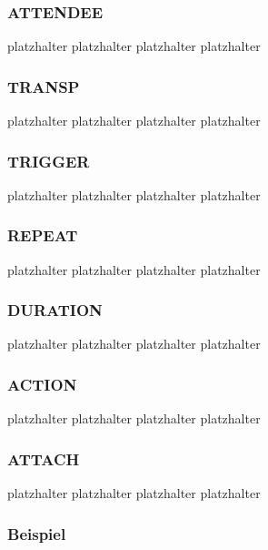 \subsubsection{ATTENDEE}
\label{sec:attendee}
platzhalter platzhalter platzhalter platzhalter 
\subsubsection{TRANSP}
\label{sec:transp}
platzhalter platzhalter platzhalter platzhalter 
\subsubsection{TRIGGER}
\label{sec:trigger}
platzhalter platzhalter platzhalter platzhalter 
\subsubsection{REPEAT}
\label{sec:repeat}
platzhalter platzhalter platzhalter platzhalter 
\subsubsection{DURATION}
\label{sec:duration}
platzhalter platzhalter platzhalter platzhalter 
\subsubsection{ACTION}
\label{sec:action}
platzhalter platzhalter platzhalter platzhalter 
\subsubsection{ATTACH}
\label{sec:attach}
platzhalter platzhalter platzhalter platzhalter 
\subsubsection{Beispiel}
\label{sec:beispiel_ical}
